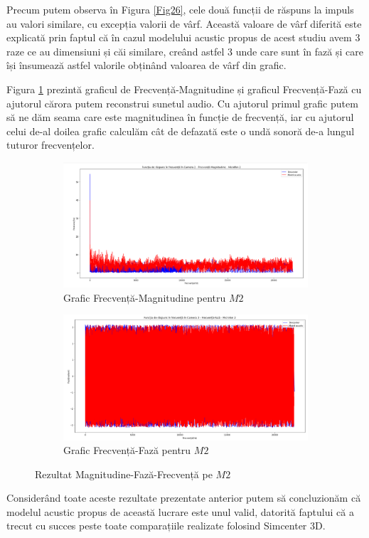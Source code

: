 	Precum putem observa în Figura \ref{Fig26}, cele două funcții de răspuns la impuls au valori similare, cu excepția valorii de vârf. Această valoare de vârf diferită este explicată prin faptul că în cazul modelului acustic propus de acest studiu avem 3 raze ce au dimensiuni și căi similare, creând astfel 3 unde care sunt în fază și care își însumează astfel valorile obținând valoarea de vârf din grafic.
	
	Figura \ref{Fig27} prezintă graficul de Frecvență-Magnitudine și graficul Frecvență-Fază cu ajutorul cărora putem reconstrui sunetul audio. Cu ajutorul primul grafic putem să ne dăm seama care este magnitudinea în funcție de frecvență, iar cu ajutorul celui de-al doilea grafic calculăm cât de defazată este o undă sonoră de-a lungul tuturor frecvențelor.
	
	\begin{figure}[!htb]%
		\begin{subfigure}[b]{1\textwidth}
			\centering
			\includegraphics[width=1\linewidth]{imagini/fr_faza_2.png} 
			\caption{Grafic Frecvență-Magnitudine pentru $M2$}
		\end{subfigure}
		\vfill
		\begin{subfigure}[b]{1\textwidth}
			\centering
			\includegraphics[width=1\linewidth]{imagini/fr_mag_2.png}
			\caption{Grafic Frecvență-Fază pentru $M2$}
		\end{subfigure}
		
		\caption{Rezultat Magnitudine-Fază-Frecvență pe $M2$}
		\label{Fig27}	
	\end{figure}

	Considerând toate aceste rezultate prezentate anterior putem să concluzionăm că modelul acustic propus de această lucrare este unul valid, datorită faptului că a trecut cu succes peste toate comparațiile realizate folosind Simcenter 3D. 


